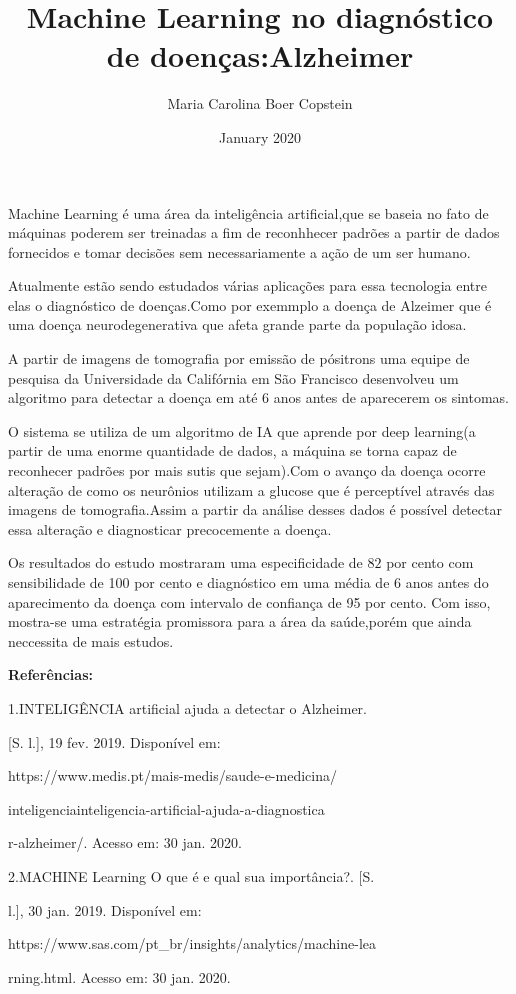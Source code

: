 \documentclass{article}
\title{Machine Learning no diagnóstico de doenças:Alzheimer}
\author{Maria Carolina Boer Copstein }
\date{January 2020}
\begin{document}
\maketitle

 \hfill
 
 Machine Learning é uma área da inteligência artificial,que se baseia no fato de máquinas poderem ser treinadas a fim de reconhhecer padrões a partir de dados fornecidos e tomar decisões sem necessariamente a ação de um ser humano.
\hfill

Atualmente estão sendo estudados várias aplicações para essa tecnologia entre elas o diagnóstico de doenças.Como por exemmplo a doença de Alzeimer que é uma doença neurodegenerativa que afeta grande parte da população idosa.
\hfill

A partir de imagens de tomografia por emissão de pósitrons uma equipe de pesquisa da Universidade da Califórnia em São Francisco desenvolveu um algoritmo para detectar a doença em até 6 anos antes de aparecerem os sintomas.
\hfill

O sistema se utiliza de um algoritmo de IA que aprende por deep learning(a partir de uma enorme quantidade de dados, a máquina se torna capaz de reconhecer padrões por mais sutis que sejam).Com o avanço da doença ocorre alteração de como os neurônios utilizam a glucose que é perceptível através das imagens de tomografia.Assim a partir da análise desses dados é possível detectar essa alteração e diagnosticar precocemente a doença.
\hfill 

Os resultados do estudo mostraram uma especificidade de $82$ por cento com sensibilidade de 100 por cento e diagnóstico em uma média de 6 anos antes do aparecimento da doença com intervalo de confiança de 95 por cento. Com isso, mostra-se uma estratégia promissora para a área da saúde,porém que ainda neccessita de mais estudos.

\hfill

\textbf{Referências:} \

\hfill

1.INTELIGÊNCIA artificial ajuda a detectar o Alzheimer.
\hfill

[S. l.], 19 fev. 2019. Disponível em:
\hfill

https://www.medis.pt/mais-medis/saude-e-medicina/
\hfill

inteligenciainteligencia-artificial-ajuda-a-diagnostica
\hfill

r-alzheimer/. Acesso em: 30 jan. 2020.

\hfill

2.MACHINE Learning O que é e qual sua importância?. [S.
\hfill

l.], 30 jan. 2019. Disponível em:
\hfill 

https://www.sas.com/pt\_br/insights/analytics/machine-lea
\hfill

rning.html. Acesso em: 30 jan. 2020.
\end{document}
